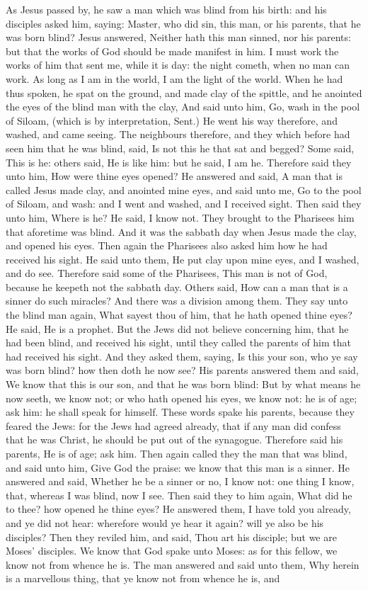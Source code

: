 As Jesus passed by, he saw a man which was blind from his birth: and his disciples asked him, saying: Master, who did sin, this man, or his parents, that he was born blind? Jesus answered, Neither hath this man sinned, nor his parents: but that the works of God should be made manifest in him. I must work the works of him that sent me, while it is day: the night cometh, when no man can work. As long as I am in the world, I am the light of the world. When he had thus spoken, he spat on the ground, and made clay of the spittle, and he anointed the eyes of the blind man with the clay, And said unto him, Go, wash in the pool of Siloam, (which is by interpretation, Sent.) He went his way therefore, and washed, and came seeing. The neighbours therefore, and they which before had seen him that he was blind, said, Is not this he that sat and begged? Some said, This is he: others said, He is like him: but he said, I am he. Therefore said they unto him, How were thine eyes opened? He answered and said, A man that is called Jesus made clay, and anointed mine eyes, and said unto me, Go to the pool of Siloam, and wash: and I went and washed, and I received sight. Then said they unto him, Where is he? He said, I know not. They brought to the Pharisees him that aforetime was blind. And it was the sabbath day when Jesus made the clay, and opened his eyes. Then again the Pharisees also asked him how he had received his sight. He said unto them, He put clay upon mine eyes, and I washed, and do see. Therefore said some of the Pharisees, This man is not of God, because he keepeth not the sabbath day. Others said, How can a man that is a sinner do such miracles? And there was a division among them. They say unto the blind man again, What sayest thou of him, that he hath opened thine eyes? He said, He is a prophet. But the Jews did not believe concerning him, that he had been blind, and received his sight, until they called the parents of him that had received his sight. And they asked them, saying, Is this your son, who ye say was born blind? how then doth he now see? His parents answered them and said, We know that this is our son, and that he was born blind: But by what means he now seeth, we know not; or who hath opened his eyes, we know not: he is of age; ask him: he shall speak for himself. These words spake his parents, because they feared the Jews: for the Jews had agreed already, that if any man did confess that he was Christ, he should be put out of the synagogue. Therefore said his parents, He is of age; ask him. Then again called they the man that was blind, and said unto him, Give God the praise: we know that this man is a sinner. He answered and said, Whether he be a sinner or no, I know not: one thing I know, that, whereas I was blind, now I see. Then said they to him again, What did he to thee? how opened he thine eyes? He answered them, I have told you already, and ye did not hear: wherefore would ye hear it again? will ye also be his disciples? Then they reviled him, and said, Thou art his disciple; but we are Moses' disciples. We know that God spake unto Moses: as for this fellow, we know not from whence he is. The man answered and said unto them, Why herein is a marvellous thing, that ye know not from whence he is, and 